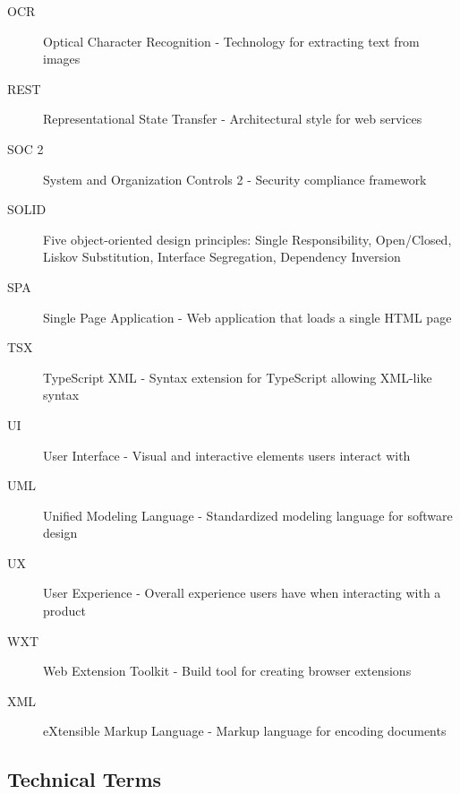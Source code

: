 \documentclass[11pt, a4paper]{article}
\theoremstyle{plain}
\theoremstyle{definition}
\begin{document}
\begin{description}
    \item[OCR] Optical Character Recognition - Technology for extracting text from images
    
    \item[REST] Representational State Transfer - Architectural style for web services
    
    \item[SOC 2] System and Organization Controls 2 - Security compliance framework
    
    \item[SOLID] Five object-oriented design principles: Single Responsibility, Open/Closed, Liskov Substitution, Interface Segregation, Dependency Inversion
    
    \item[SPA] Single Page Application - Web application that loads a single HTML page
    
    \item[TSX] TypeScript XML - Syntax extension for TypeScript allowing XML-like syntax
    
    \item[UI] User Interface - Visual and interactive elements users interact with
    
    \item[UML] Unified Modeling Language - Standardized modeling language for software design
    
    \item[UX] User Experience - Overall experience users have when interacting with a product
    
    \item[WXT] Web Extension Toolkit - Build tool for creating browser extensions
    
    \item[XML] eXtensible Markup Language - Markup language for encoding documents
\end{description}

\subsection{Technical Terms}
\end{document}
